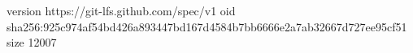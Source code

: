 version https://git-lfs.github.com/spec/v1
oid sha256:925c974af54bd426a893447bd167d4584b7bb6666e2a7ab32667d727ee95cf51
size 12007
